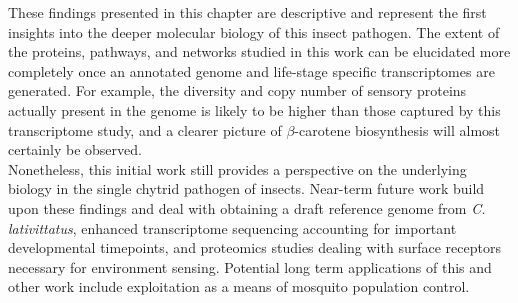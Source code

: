 \indent These findings presented in this chapter are descriptive and represent the first insights into the deeper molecular biology of this insect pathogen. The extent of the proteins, pathways, and networks studied in this work can be elucidated more completely once an annotated genome and life-stage specific transcriptomes are generated. For example, the diversity and copy number of sensory proteins actually present in the genome is likely to be higher than those captured by this transcriptome study, and a clearer picture of $\beta$-carotene biosynthesis will almost certainly be observed. \\
\indent Nonetheless, this initial work still provides a perspective on the underlying biology in the single chytrid pathogen of insects. Near-term future work build upon these findings and deal with obtaining a draft reference genome from \textit{C. lativittatus}, enhanced transcriptome sequencing accounting for important developmental timepoints, and proteomics studies dealing with surface receptors necessary for environment sensing. Potential long term applications of this and other work include exploitation as a means of mosquito population control. \\
